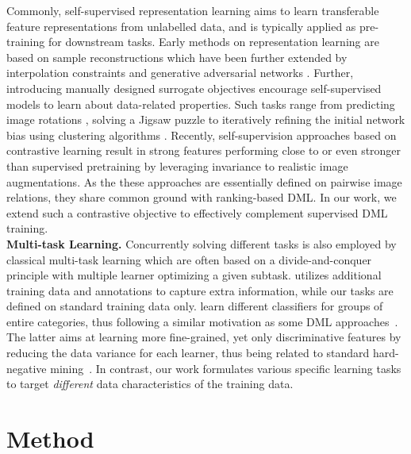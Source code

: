 \documentclass[runningheads]{llncs}
\begin{document}
Commonly, self-supervised representation learning aims to learn transferable feature representations from unlabelled data, and is typically applied as pre-training for downstream tasks\cite{hsu2018unsupervised,pr20_reliable_relations}. Early methods on representation learning are based on sample reconstructions \cite{vincentnoisyauto,vae} which have been further extended by interpolation constraints \cite{acai} and generative adversarial networks \cite{chen2016infogan,ali,hali,bigan}. Further, introducing manually designed surrogate objectives encourage self-supervised models to learn about data-related properties. Such tasks range from predicting image rotations \cite{predict_rotations}, solving a Jigsaw puzzle \cite{jigsaw,jigsaw++,buechler_ECCV_2018} to iteratively refining the initial network bias using clustering algorithms \cite{deepcluster}. Recently, self-supervision approaches based on contrastive learning result in strong features performing close to or even stronger than supervised pretraining \cite{moco,pretextmisra,newhintonpaper,tian2019contrastive} by leveraging invariance to realistic image augmentations. As the these approaches are essentially defined on pairwise image relations, they share common ground with ranking-based DML. In our work, we extend such a contrastive objective to effectively complement supervised DML training. 
\\
\noindent
\textbf{Multi-task Learning.}
Concurrently solving different tasks is also employed by classical multi-task learning which are often based on a divide-and-conquer principle with multiple learner optimizing a given subtask. \cite{mtl_bhattarai} utilizes additional training data and annotations to capture extra information, while our tasks are defined on standard training data only. \cite{mtl_pu} learn different classifiers for groups of entire categories, thus following a similar motivation as some DML approaches~\cite{abier,Sanakoyeu_2019_CVPR}. The latter aims at learning more fine-grained, yet only discriminative features by reducing the data variance for each learner, thus being related to standard hard-negative mining~\cite{semihard}. In contrast, our work formulates various specific learning tasks to target \textit{different} data characteristics of the training data.




\section{Method}
\label{sec:Method}
\end{document}
